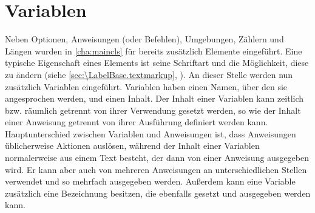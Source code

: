 \section{Variablen}
%
\BeginIndexGroup
{}%

Neben Optionen, Anweisungen (oder Befehlen), Umgebungen, Zählern und Längen
wurden in \autoref{cha:maincls} für \KOMAScript{} bereits zusätzlich Elemente
eingeführt.  Eine typische Eigenschaft eines Elements ist seine Schriftart und
die Möglichkeit, diese zu ändern (siehe \autoref{sec:\LabelBase.textmarkup},
).  An dieser Stelle werden nun
zusätzlich Variablen eingeführt. Variablen haben einen
Namen, über den sie angesprochen werden,
und einen Inhalt. Der Inhalt einer
Variablen kann zeitlich bzw. räumlich getrennt von ihrer Verwendung gesetzt
werden, so wie der Inhalt einer Anweisung getrennt von ihrer Ausführung
definiert werden kann. Hauptunterschied zwischen Variablen und Anweisungen
ist, dass Anweisungen üblicherweise Aktionen auslösen, während der Inhalt
einer Variablen normalerweise aus einem Text besteht, der dann von einer
Anweisung ausgegeben wird. Er kann aber auch von mehreren Anweisungen an
unterschiedlichen Stellen verwendet und so mehrfach ausgegeben
werden. Außerdem kann eine Variable zusätzlich eine
Bezeichnung besitzen, die
ebenfalls gesetzt und ausgegeben werden kann.

